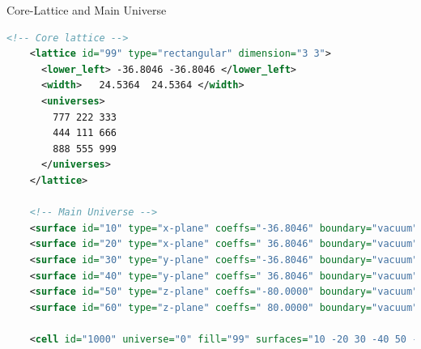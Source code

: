 \begin{frame}[fragile]{Core-Lattice and Main Universe}

  \begin{scriptsize}
    \begin{lstlisting}[language=XML,gobble=4]
    <!-- Core lattice -->
    <lattice id="99" type="rectangular" dimension="3 3">
      <lower_left> -36.8046 -36.8046 </lower_left>
      <width>   24.5364  24.5364 </width>
      <universes>
        777 222 333
        444 111 666
        888 555 999
      </universes>
    </lattice>
    
    <!-- Main Universe -->
    <surface id="10" type="x-plane" coeffs="-36.8046" boundary="vacuum"/>
    <surface id="20" type="x-plane" coeffs=" 36.8046" boundary="vacuum"/>
    <surface id="30" type="y-plane" coeffs="-36.8046" boundary="vacuum"/>
    <surface id="40" type="y-plane" coeffs=" 36.8046" boundary="vacuum"/>
    <surface id="50" type="z-plane" coeffs="-80.0000" boundary="vacuum"/>
    <surface id="60" type="z-plane" coeffs=" 80.0000" boundary="vacuum"/>
    
    <cell id="1000" universe="0" fill="99" surfaces="10 -20 30 -40 50 -60"/>
    
    \end{lstlisting}
  \end{scriptsize}
  
\end{frame}

